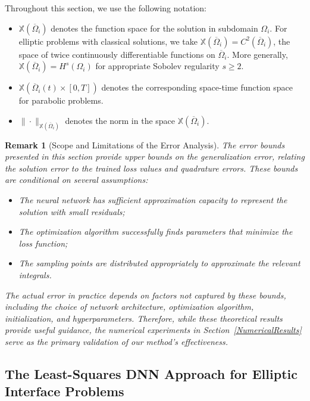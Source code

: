 \documentclass{article}
\newtheorem{remark}{Remark}[section]
\begin{document}
Throughout this section, we use the following notation:
\begin{itemize}
    \item $\mathbb{X}(\overline{\Omega}_i)$ denotes the function space for the solution in subdomain $\Omega_i$. For elliptic problems with classical solutions, we take $\mathbb{X}(\overline{\Omega}_i) = C^2(\overline{\Omega}_i)$, the space of twice continuously differentiable functions on $\overline{\Omega}_i$. More generally, $\mathbb{X}(\overline{\Omega}_i) = H^s(\Omega_i)$ for appropriate Sobolev regularity $s \geq 2$.
    \item $\mathbb{X}(\overline{\Omega}_i(t) \times [0, T])$ denotes the corresponding space-time function space for parabolic problems.
    \item $\|\cdot\|_{\mathbb{X}(\overline{\Omega}_i)}$ denotes the norm in the space $\mathbb{X}(\overline{\Omega}_i)$.
\end{itemize}

\begin{remark}[Scope and Limitations of the Error Analysis]
The error bounds presented in this section provide \emph{upper bounds} on the generalization error, relating the solution error to the trained loss values and quadrature errors. These bounds are conditional on several assumptions:
\begin{itemize}
    \item The neural network has sufficient approximation capacity to represent the solution with small residuals;
    \item The optimization algorithm successfully finds parameters that minimize the loss function;
    \item The sampling points are distributed appropriately to approximate the relevant integrals.
\end{itemize}
The actual error in practice depends on factors not captured by these bounds, including the choice of network architecture, optimization algorithm, initialization, and hyperparameters. Therefore, while these theoretical results provide useful guidance, the numerical experiments in Section~\ref{NumericalResults} serve as the primary validation of our method's effectiveness.
\end{remark}

\subsection{The Least-Squares DNN Approach for Elliptic Interface Problems}\label{Least-SquaresE}
\end{document}
